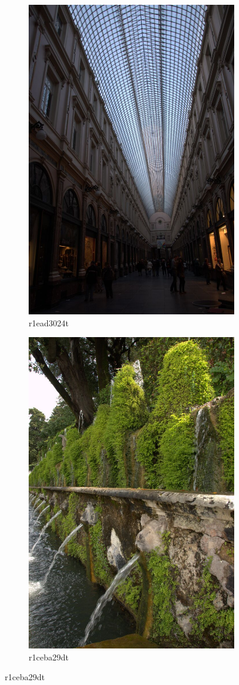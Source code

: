 \documentclass{ipol}
\begin{document}
\begin{figure}[ht]
\begin{subfigure}[c]{.31\linewidth}
    \includegraphics[height=\linewidth]{images/original/r1ead3024t.jpeg}
    \caption{r1ead3024t}
    \end{subfigure}\hfill%
    \begin{subfigure}[c]{.31\linewidth}\centering
    \includegraphics[height=\linewidth]{images/original/r1ceba29dt.jpeg}
    \caption{r1ceba29dt}
    \end{subfigure}%
    

\end{figure}
\end{document}
